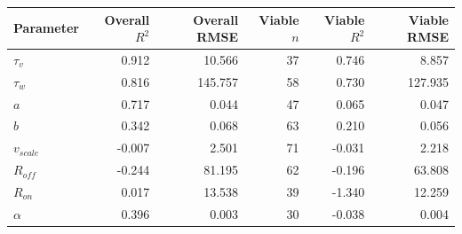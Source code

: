 \begin{tabular}{lrrrrr}
\toprule
Parameter & Overall $R^2$ & Overall RMSE & Viable $n$ & Viable $R^2$ & Viable RMSE \\
\midrule
$\tau_v$ & 0.912 & 10.566 & 37 & 0.746 & 8.857 \\
$\tau_w$ & 0.816 & 145.757 & 58 & 0.730 & 127.935 \\
$a$ & 0.717 & 0.044 & 47 & 0.065 & 0.047 \\
$b$ & 0.342 & 0.068 & 63 & 0.210 & 0.056 \\
$v_{scale}$ & -0.007 & 2.501 & 71 & -0.031 & 2.218 \\
$R_{off}$ & -0.244 & 81.195 & 62 & -0.196 & 63.808 \\
$R_{on}$ & 0.017 & 13.538 & 39 & -1.340 & 12.259 \\
$\alpha$ & 0.396 & 0.003 & 30 & -0.038 & 0.004 \\
\bottomrule
\end{tabular}